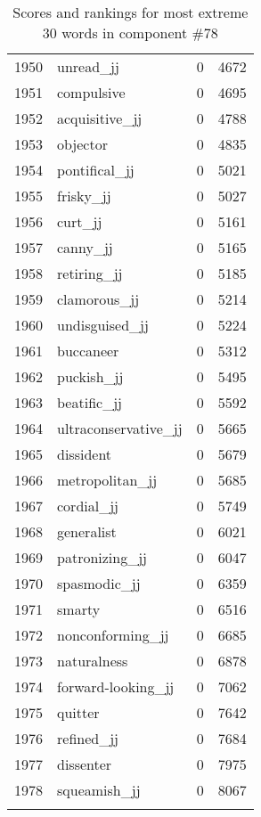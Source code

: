 \begin{longtable}[!htbp]{| rlr@{.}l |}
    1950 & unread\_jj & 0 & 4672 \\
    1951 & compulsive & 0 & 4695 \\
    1952 & acquisitive\_jj & 0 & 4788 \\
    1953 & objector & 0 & 4835 \\
    1954 & pontifical\_jj & 0 & 5021 \\
    1955 & frisky\_jj & 0 & 5027 \\
    1956 & curt\_jj & 0 & 5161 \\
    1957 & canny\_jj & 0 & 5165 \\
    1958 & retiring\_jj & 0 & 5185 \\
    1959 & clamorous\_jj & 0 & 5214 \\
    1960 & undisguised\_jj & 0 & 5224 \\
    1961 & buccaneer & 0 & 5312 \\
    1962 & puckish\_jj & 0 & 5495 \\
    1963 & beatific\_jj & 0 & 5592 \\
    1964 & ultraconservative\_jj & 0 & 5665 \\
    1965 & dissident & 0 & 5679 \\
    1966 & metropolitan\_jj & 0 & 5685 \\
    1967 & cordial\_jj & 0 & 5749 \\
    1968 & generalist & 0 & 6021 \\
    1969 & patronizing\_jj & 0 & 6047 \\
    1970 & spasmodic\_jj & 0 & 6359 \\
    1971 & smarty & 0 & 6516 \\
    1972 & nonconforming\_jj & 0 & 6685 \\
    1973 & naturalness & 0 & 6878 \\
    1974 & forward-looking\_jj & 0 & 7062 \\
    1975 & quitter & 0 & 7642 \\
    1976 & refined\_jj & 0 & 7684 \\
    1977 & dissenter & 0 & 7975 \\
    1978 & squeamish\_jj & 0 & 8067 \\
    \hline
    \caption{Scores and rankings for most extreme 30 words in component \#78} \\
\end{longtable}

